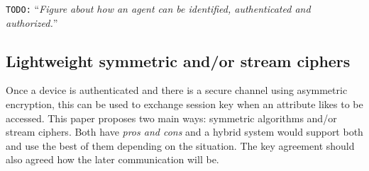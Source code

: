 \documentclass[10pt,a4paper,twoside]{llncs}
\newcommand{\todo}[1]{\texttt{\color{red}TODO:} ``\emph{#1}''}
\newcommand{\tango}{\textsc{Tango}}
\begin{document}

\todo{Figure about how an agent can be identified, authenticated and authorized.}


\subsection{Lightweight symmetric and/or stream ciphers}

Once a device is authenticated and there is a secure channel using asymmetric encryption, this can be used to exchange session key when an attribute likes to be accessed. This paper proposes two main ways: symmetric algorithms and/or stream ciphers. Both have \emph{pros and cons} and a hybrid system would support both and use the best of them depending on the situation. The key agreement should also agreed how the later communication will be.
\end{document}

